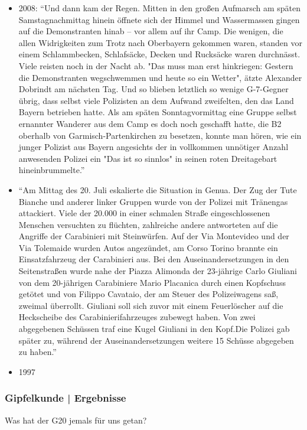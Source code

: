 \documentclass[]{beamer}
\begin{document}
\begin{frame}
{\begin{itemize}
		\item 2008: \enquote{Und dann kam der Regen. Mitten in den großen Aufmarsch am späten Samstagnachmittag hinein öffnete sich der Himmel und Wassermassen gingen auf die Demonstranten hinab – vor allem auf ihr Camp. Die wenigen, die allen Widrigkeiten zum Trotz nach Oberbayern gekommen waren, standen vor einem Schlammbecken, Schlafsäcke, Decken und Rucksäcke waren durchnässt. Viele reisten noch in der Nacht ab. "Das muss man erst hinkriegen: Gestern die Demonstranten wegschwemmen und heute so ein Wetter", ätzte Alexander Dobrindt am nächsten Tag. Und so blieben letztlich so wenige G-7-Gegner übrig, dass selbst viele Polizisten an dem Aufwand zweifelten, den das Land Bayern betrieben hatte. Als am späten Sonntagvormittag eine Gruppe selbst ernannter Wanderer aus dem Camp es doch noch geschafft hatte, die B2 oberhalb von Garmisch-Partenkirchen zu besetzen, konnte man hören, wie ein junger Polizist aus Bayern angesichts der in vollkommen unnötiger Anzahl anwesenden Polizei ein "Das ist so sinnlos" in seinen roten Dreitagebart hineinbrummelte.} \cite{Erk2015}
		\item \enquote{Am Mittag des 20. Juli eskalierte die Situation in Genua. Der Zug der Tute Bianche und anderer linker Gruppen wurde von der Polizei mit Tränengas attackiert. Viele der 20.000 in einer schmalen Straße eingeschlossenen Menschen versuchten zu flüchten, zahlreiche andere antworteten auf die Angriffe der Carabinieri mit Steinwürfen. Auf der Via Montevideo und der Via Tolemaide wurden Autos angezündet, am Corso Torino brannte ein Einsatzfahrzeug der Carabinieri aus. Bei den Auseinandersetzungen in den Seitenstraßen wurde nahe der Piazza Alimonda der 23-jährige Carlo Giuliani von dem 20-jährigen Carabiniere Mario Placanica durch einen Kopfschuss getötet und von Filippo Cavataio, der am Steuer des Polizeiwagens saß, zweimal überrollt. Giuliani soll sich zuvor mit einem Feuerlöscher auf die Heckscheibe des Carabinierifahrzeuges zubewegt haben. Von zwei abgegebenen Schüssen traf eine Kugel Giuliani in den Kopf.Die Polizei gab später zu, während der Auseinandersetzungen weitere 15 Schüsse abgegeben zu haben.} \cite{wiki:g8genua2001} \cite{Matteoni2011}
		\item 1997 \cite{Kubitza2015}
	\end{itemize}}
	\end{frame}

	\begin{frame}
	\frametitle{Gipfelkunde | Ergebnisse}
	Was hat der G20 jemals für uns getan?
\end{frame}
\end{document}
